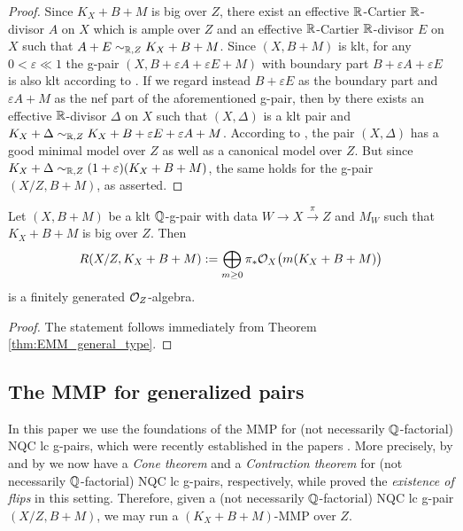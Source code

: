 	\begin{proof}
		Since $K_X+B+M$ is big over $Z$, there exist an effective $\mathbb{R}$-Cartier $\mathbb{R}$-divisor $A$ on $X$ which is ample over $Z$ and an effective $\mathbb{R}$-Cartier $\mathbb{R}$-divisor $E$ on $X$ such that $A+E\sim_{\mathbb{R},Z}K_X+B+M$. Since $(X,B+M)$ is klt, for any $ 0 < \varepsilon \ll 1 $ the g-pair $(X,B+\varepsilon A+\varepsilon E+M)$ with boundary part $B+\varepsilon A+\varepsilon E $ is also klt according to \cite[Remark 4.2(2)]{BZ16}. If we regard instead $B+\varepsilon E$ as the boundary part and $\varepsilon A + M$ as the nef part of the aforementioned g-pair, then by \cite[Lemma 3.4]{LX22b} there exists an effective $\mathbb{R}$-divisor $\Delta$ on $X$ such that $(X,\Delta)$ is a klt pair and $K_X+\Delta \sim_{\mathbb{R},Z} K_X+B+\varepsilon E+\varepsilon A+M$. According to \cite{BCHM10}, 
		the pair $(X,\Delta)$ has a good minimal model over $Z$ as well as a canonical model over $Z$. But since $ K_X+\Delta \sim_{\mathbb{R},Z} (1+\varepsilon) (K_X+B+M)$, the same holds for the g-pair $(X/Z,B+M)$, as asserted.
	\end{proof}
	
	\begin{cor}
		Let $(X,B+M)$ be a klt $\mathbb{Q}$-g-pair with data $ W \to X \overset{\pi}{\longrightarrow} Z $ and $ M_W $ such that $K_X+B+M$ is big over $Z$. Then 
		\[ R(X/Z,K_X+B+M) := \bigoplus_{m \geq 0} \pi_* \mathcal{O}_X \big( m(K_X+B+M) \big) \]
		is a finitely generated $ \mathcal{O}_Z $-algebra.
	\end{cor}
	
	\begin{proof}
		The statement follows immediately from Theorem \ref{thm:EMM_general_type}.
	\end{proof}
	
	
	\subsection{The MMP for generalized pairs}
	\label{subsection:MMP_g-pairs}
	
	In this paper we use the foundations of the MMP for (not necessarily $ \mathbb{Q} $-factorial) NQC lc g-pairs, which were recently established in the papers \cite{HaconLiu21,LX22b,Xie22}. More precisely, by \cite[Theorem 5.1]{HaconLiu21} and by \cite[Theorem 1.5]{Xie22} we now have a \emph{Cone theorem} and a \emph{Contraction theorem} for (not necessarily $ \mathbb{Q} $-factorial) NQC lc g-pairs, respectively, while \cite[Theorem 1.2]{LX22b} proved the \emph{existence of flips} in this setting. Therefore, given a (not necessarily $ \mathbb{Q} $-factorial) NQC lc g-pair $ (X/Z,B+M) $, we may run a $ (K_X + B + M) $-MMP over $Z$. 
	
